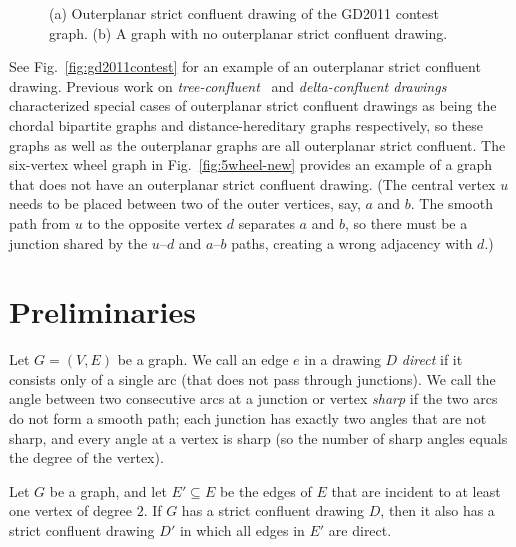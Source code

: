 \documentclass{llncs}
\begin{document}
\begin{figure}[b]
	\centering
		\hfil
	\caption{(a) Outerplanar strict confluent drawing of the GD2011 contest graph. (b) A graph with no outerplanar strict confluent drawing.}
	\label{fig:sea-creature-5wheel-new}
\end{figure}

See Fig.~\ref{fig:gd2011contest} for an example of an outerplanar strict confluent drawing.  Previous work on  \emph{tree-confluent}~\cite{hss-ttcd-04} and \emph{delta-confluent drawings}~\cite{egm-dcd-06} characterized special cases of outerplanar strict confluent drawings as being the chordal bipartite graphs and distance-hereditary graphs respectively, so these graphs as well as the outerplanar graphs are all outerplanar strict confluent. The six-vertex wheel graph in Fig.~\ref{fig:5wheel-new} provides an example of a graph that does not have an outerplanar strict confluent drawing. (The central vertex $u$ needs to be placed between two of the outer vertices, say, $a$ and $b$. The smooth path from $u$ to the opposite vertex $d$ separates $a$ and $b$, so there must be a junction shared by the $u$--$d$ and $a$--$b$ paths, creating a wrong adjacency with $d$.)




\section {Preliminaries}

Let $G = (V,E)$ be a graph.
We call an edge $e$ in a drawing $D$ \emph {direct} if it consists only of a single arc (that does not pass through junctions).
We call the angle between two consecutive arcs at a junction or vertex \emph{sharp} if the two arcs do not form a smooth path; each junction has exactly two angles that are not sharp, and every angle at a vertex is sharp (so the number of sharp angles equals the degree of the vertex).

\begin {lemma} \label {lem:deg2}
  Let $G$ be a graph, and let $E' \subseteq E$ be the edges of $E$ that are incident to at least one vertex of degree $2$.
  If $G$ has a strict confluent drawing $D$, then it also has a strict confluent drawing $D'$ in which all edges in $E'$ are direct.
\end {lemma}
\end{document}
